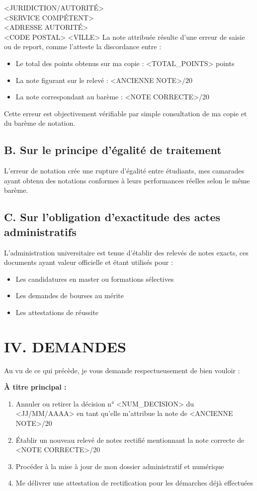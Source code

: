\documentclass[12pt,french]{scrlttr2}
\begin{document}
\begin{letter}{
<JURIDICTION/AUTORITÉ>\\
<SERVICE COMPÉTENT>\\
<ADRESSE AUTORITÉ>\\
<CODE POSTAL> <VILLE>
}
La note attribuée résulte d'une erreur de saisie ou de report, comme l'atteste la discordance entre :
\begin{itemize}
\item Le total des points obtenus sur ma copie : <TOTAL_POINTS> points
\item La note figurant sur le relevé : <ANCIENNE NOTE>/20
\item La note correspondant au barème : <NOTE CORRECTE>/20
\end{itemize}

Cette erreur est objectivement vérifiable par simple consultation de ma copie et du barème de notation.

\subsection*{B. Sur le principe d'égalité de traitement}

L'erreur de notation crée une rupture d'égalité entre étudiants, mes camarades ayant obtenu des notations conformes à leurs performances réelles selon le même barème.

\subsection*{C. Sur l'obligation d'exactitude des actes administratifs}

L'administration universitaire est tenue d'établir des relevés de notes exacts, ces documents ayant valeur officielle et étant utilisés pour :
\begin{itemize}
\item Les candidatures en master ou formations sélectives
\item Les demandes de bourses au mérite
\item Les attestations de réussite
\end{itemize}

\section*{IV. DEMANDES}

Au vu de ce qui précède, je vous demande respectueusement de bien vouloir :

\textbf{À titre principal :}
\begin{enumerate}
\item Annuler ou retirer la décision n° <NUM_DECISION> du <JJ/MM/AAAA> en tant qu'elle m'attribue la note de <ANCIENNE NOTE>/20
\item Établir un nouveau relevé de notes rectifié mentionnant la note correcte de <NOTE CORRECTE>/20
\item Procéder à la mise à jour de mon dossier administratif et numérique
\item Me délivrer une attestation de rectification pour les démarches déjà effectuées
\end{enumerate}


\end{letter}
\end{document}

